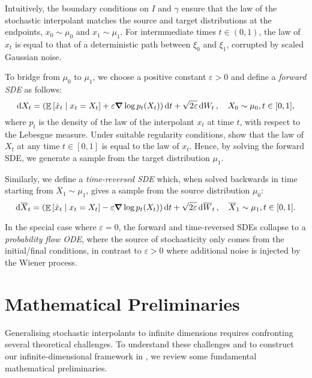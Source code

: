 Intuitively, the boundary conditions on \(I\) and \(\gamma\) ensure that the law of the stochastic interpolant matches the source and target distributions at the endpoints, \(x_{0} \sim \mu_{0}\) and \(x_{1} \sim \mu_{1}\). For intermmediate times \(t \in (0, 1)\), the law of \(x_{t}\) is equal to that of a deterministic path between \(\xi_{0}\) and \(\xi_{1}\), corrupted by scaled Gaussian noise.

To bridge from \(\mu_{0}\) to \(\mu_{1}\), we choose a positive constant \(\varepsilon > 0\) and define a \textit{forward SDE} as follows:
\[
  \dd{X_{t}} = \qty(\mathop{\mathbb{E}}\qty[\dot{x}_{t} \mid x_{t} = X_{t}] + \varepsilon \grad \log p_{t}(X_{t}))\dd{t} + \sqrt{2\varepsilon} \dd{W_{t}}, \quad X_{0} \sim \mu_{0}, t \in [0, 1],
\]
where \(p_{t}\) is the density of the law of the interpolant \(x_{t}\) at time \(t\), with respect to the Lebesgue measure. Under suitable regularity conditions, \citet{albergo2023stochasticinterpolantsunifyingframework} show that the law of \(X_{t}\) at any time \(t \in [0, 1]\) is equal to the law of \(x_{t}\). Hence, by solving the forward SDE, we generate a sample from the target distribution \(\mu_{1}\). %

Similarly, we define a \textit{time-reversed SDE} which, when solved backwards in time starting from \(\overline{X}_{1} \sim \mu_{1}\), gives a sample from the source distribution \(\mu_{0}\):
\[
  \dd{ \overline{X}_{t}} = \qty(\mathop{\mathbb{E}}\qty[\dot{x}_{t} \mid x_{t} = X_{t}] - \varepsilon \grad \log p_{t}(X_{t}))\dd{t} + \sqrt{2\varepsilon} \dd{ \overline{W}_{t}}, \quad \overline{X}_{1} \sim \mu_{1}, t \in [0, 1].
\]

In the special case where \(\varepsilon = 0\), the forward and time-reversed SDEs collapse to a \textit{probability flow ODE}, where the source of stochasticity only comes from the initial/final conditions, in contrast to \(\varepsilon > 0\) where additional noise is injected by the Wiener process. %





\section{Mathematical Preliminaries}
Generalising stochastic interpolants to infinite dimensions requires confronting several theoretical challenges. To understand these challenges and to construct our infinite-dimensional framework in , we review some fundamental mathematical preliminaries.

